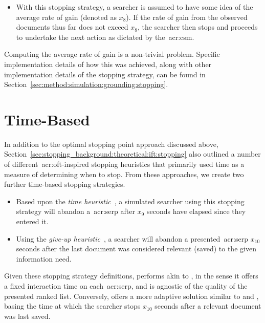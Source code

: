 \begin{itemize}
    \item{ With this stopping strategy, a searcher is assumed to have some idea of the average rate of gain (denoted as $x_8$). If the rate of gain from the observed documents thus far does not exceed $x_8$, the searcher then stops and proceeds to undertake the next action as dictated by the~\gls{acr:csm}.}
\end{itemize}

Computing the average rate of gain is a non-trivial problem. Specific implementation details of how this was achieved, along with other implementation details of the stopping strategy, can be found in Section~\ref{sec:method:simulation:grounding:stopping}.

\section{Time-Based}\label{sec:strategies:time}
In addition to the optimal stopping point approach discussed above, Section~\ref{sec:stopping_background:theoretical:ift:stopping} also outlined a number of different~\gls{acr:oft}-inspired stopping heuristics that primarily used time as a measure of determining when to stop. From these approaches, we create two further time-based stopping strategies.

\begin{itemize}
    \item{ Based upon the \emph{time heuristic}~\citep{charles1972behaviour, krebs1973time_rule}, a simulated searcher using this stopping strategy will abandon a~\gls{acr:serp} after $x_9$ seconds have elapsed since they entered it.}
    
    \item{ Using the \emph{give-up heuristic}~\citep{krebs1974leave_after_rule}, a searcher will abandon a presented~\gls{acr:serp} $x_{10}$ seconds after the last document was considered relevant (saved) to the given information need.}
\end{itemize}

Given these stopping strategy definitions,  performs akin to , in the sense it offers a fixed interaction time on each~\gls{acr:serp}, and is agnostic of the quality of the presented ranked list. Conversely,  offers a more adaptive solution similar to  and , basing the time at which the searcher stops $x_{10}$ seconds after a relevant document was last saved.


